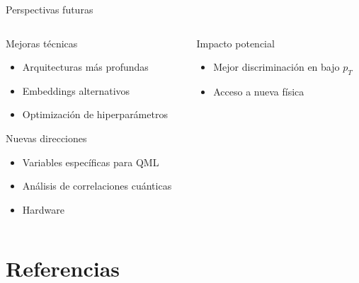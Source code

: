 \documentclass[aspectratio=169]{beamer}
\begin{document}
\begin{frame}{Perspectivas futuras}
  \begin{columns}
    \begin{column}{0.48\textwidth}
      \begin{block}{Mejoras técnicas}
        \begin{itemize}
          \item Arquitecturas más profundas
          \item Embeddings alternativos
          \item Optimización de hiperparámetros
        \end{itemize}
      \end{block}
      \vspace{-0.2em}
      \begin{alertblock}{Nuevas direcciones}
        \begin{itemize}
          \item Variables específicas para QML
          \item Análisis de correlaciones cuánticas
          \item Hardware
        \end{itemize}
      \end{alertblock}
    \end{column}
    \begin{column}{0.48\textwidth}
      \begin{block}{Impacto potencial}
        \begin{itemize}
          \item Mejor discriminación en bajo \texorpdfstring{$p_T$}{pT}
          \item Acceso a nueva física
        \end{itemize}
      \end{block}
    \end{column}
  \end{columns}
\end{frame}

\section{Referencias}
\end{document}
